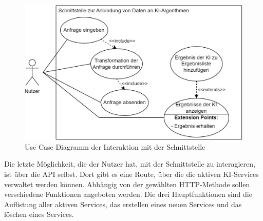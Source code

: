 \begin{figure}[H]
  \centering
    \includegraphics[width = 15cm]{bilder/UseCase}
    \caption{Use Case Diagramm der Interaktion mit der Schnittstelle}
\end{figure}

Die letzte Möglichkeit, die der Nutzer hat, mit der Schnittstelle zu interagieren, ist über die API selbst. Dort gibt es eine Route, über die die aktiven KI-Services verwaltet werden können. Abhängig von der gewählten HTTP-Methode sollen verschiedene Funktionen angeboten werden. Die drei Hauptfunktionen sind die Auflistung aller aktiven Services, das erstellen eines neuen Services und das löschen eines Services.

